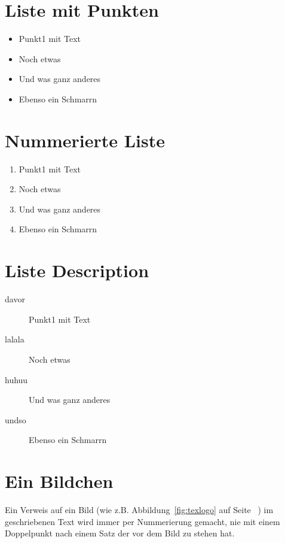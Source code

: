 \section{Liste mit Punkten}
\begin{itemize}
\item Punkt1 mit Text
\item Noch etwas
\item Und was ganz anderes
\item Ebenso ein Schmarrn
\end{itemize}



\section{Nummerierte Liste}
\begin{enumerate}
\item Punkt1 mit Text
\item Noch etwas
\item Und was ganz anderes
\item Ebenso ein Schmarrn
\end{enumerate}



\section{Liste Description}
\begin{description}
\item[davor] Punkt1 mit Text
\item[lalala] Noch etwas
\item[huhuu] Und was ganz anderes
\item[undso] Ebenso ein Schmarrn
\end{description}



\section{Ein Bildchen}
Ein Verweis auf ein Bild (wie z.B. Abbildung~\ref{fig:texlogo} auf Seite~\pageref{fig:texlogo} ) im geschriebenen Text wird immer per Nummerierung gemacht, nie mit einem Doppelpunkt nach einem Satz der vor dem Bild zu stehen hat. 

